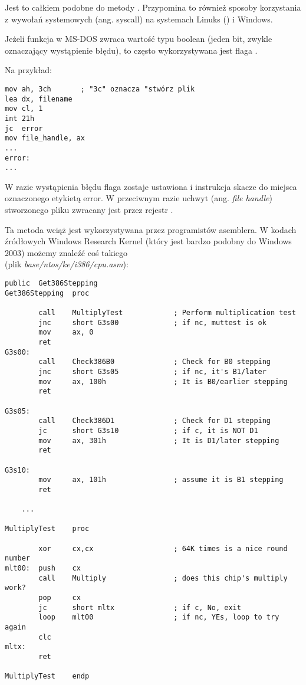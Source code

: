 Jest to całkiem podobne do metody .
Przypomina to również sposoby korzystania z wywołań systemowych (ang. syscall) na systemach Linuks () i Windows.

Jeżeli funkcja w MS-DOS zwraca wartość typu boolean (jeden bit, zwykle oznaczający wystąpienie błędu), to często wykorzystywana jest flaga .

Na przykład:

\begin{lstlisting}[style=customasmx86]
mov ah, 3ch       ; "3c" oznacza "stwórz plik
lea dx, filename
mov cl, 1
int 21h
jc  error
mov file_handle, ax
...
error:
...
\end{lstlisting}

W razie wystąpienia błędu flaga  zostaje ustawiona i instrukcja  skacze do miejsca oznaczonego etykietą error. W przeciwnym razie uchwyt (ang. \emph{file handle}) stworzonego pliku zwracany jest przez rejestr .

Ta metoda wciąż jest wykorzystywana przez programistów asemblera.
W kodach źródłowych Windows Research Kernel (który jest bardzo podobny do Windows 2003) możemy znaleźć coś takiego\\
(plik \emph{base/ntos/ke/i386/cpu.asm}):

\begin{lstlisting}[style=customasmx86]
        public  Get386Stepping
Get386Stepping  proc

        call    MultiplyTest            ; Perform multiplication test
        jnc     short G3s00             ; if nc, muttest is ok
        mov     ax, 0
        ret
G3s00:
        call    Check386B0              ; Check for B0 stepping
        jnc     short G3s05             ; if nc, it's B1/later
        mov     ax, 100h                ; It is B0/earlier stepping
        ret

G3s05:
        call    Check386D1              ; Check for D1 stepping
        jc      short G3s10             ; if c, it is NOT D1
        mov     ax, 301h                ; It is D1/later stepping
        ret

G3s10:
        mov     ax, 101h                ; assume it is B1 stepping
        ret

	...

MultiplyTest    proc

        xor     cx,cx                   ; 64K times is a nice round number
mlt00:  push    cx
        call    Multiply                ; does this chip's multiply work?
        pop     cx
        jc      short mltx              ; if c, No, exit
        loop    mlt00                   ; if nc, YEs, loop to try again
        clc
mltx:
        ret

MultiplyTest    endp
\end{lstlisting}



